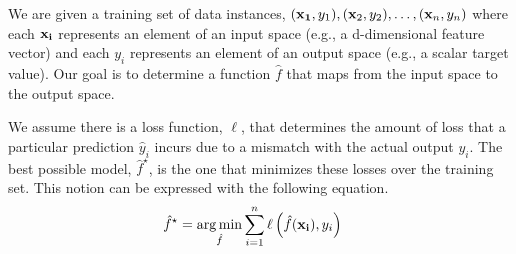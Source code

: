\documentclass[assignment02_Solutions]{subfiles}
\begin{document}
\begin{recall}
We are given a training set of data instances, $(\mathbf{x_1}, y_1), (\mathbf{x}_2, y_2), \ldots, (\mathbf{x}_n, y_n)$ where each $\mathbf{x_i}$ represents an element of an input space (e.g., a d-dimensional feature vector) and each $y_i$ represents an element of an output space (e.g., a scalar target value).  Our goal is to determine a function $\hat{f}$ that maps from the input space to the output space.

We assume there is a loss function, $\ell$, that determines the amount of loss that a particular prediction $\hat{y}_i$ incurs due to a mismatch with the actual output $y_i$.  The best possible model, $\hat{f}^\star$, is the one that minimizes these losses over the training set.  This notion can be expressed with the following equation.
\begin{align}
\hat{f}^\star &= \operatorname*{arg\,min}_{\hat{f}} \sum_{i=1}^n \ell \left ( \hat{f}(\mathbf{x_i}), y_i \right )
\end{align} 

\end{recall}

\vspace{1em}
\end{document}
